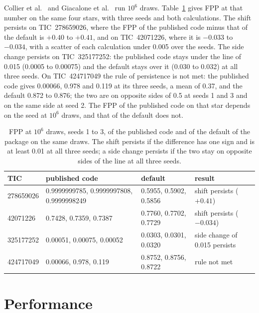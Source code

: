\documentclass[11pt]{article}
\begin{document}
Collier et al.\ \cite{collier2026} and Giacalone et al.\ \cite{giacalone2021} run $10^{6}$ draws. Table~\ref{tab:persistence} gives FPP at that number on the same four stars, with three seeds and both calculations. The shift persists on TIC~278659026, where the FPP of the published code minus that of the default is $+0.40$ to $+0.41$, and on TIC~42071226, where it is $-0.033$ to $-0.034$, with a scatter of each calculation under 0.005 over the seeds. The side change persists on TIC~325177252: the published code stays under the line of 0.015 (0.0005 to 0.00075) and the default stays over it (0.030 to 0.032) at all three seeds. On TIC~424717049 the rule of persistence is not met: the published code gives 0.00066, 0.978 and 0.119 at its three seeds, a mean of 0.37, and the default 0.872 to 0.876; the two are on opposite sides of 0.5 at seeds 1 and 3 and on the same side at seed 2. The FPP of the published code on that star depends on the seed at $10^{6}$ draws, and that of the default does not.

\begin{table}[ht]
\centering
\caption{FPP at $10^{6}$ draws, seeds 1 to 3, of the published code and of the default of the package on the same draws. The shift persists if the difference has one sign and is at least 0.01 at all three seeds; a side change persists if the two stay on opposite sides of the line at all three seeds.}\label{tab:persistence}
\footnotesize
\begin{tabular}{lllp{3.6cm}}
\toprule
TIC & published code & default & result \\
\midrule
278659026 & 0.9999999785, 0.9999997808, 0.9999998249 & 0.5955, 0.5902, 0.5856 & shift persists ($+0.41$) \\
42071226 & 0.7428, 0.7359, 0.7387 & 0.7760, 0.7702, 0.7729 & shift persists ($-0.034$) \\
325177252 & 0.00051, 0.00075, 0.00052 & 0.0303, 0.0301, 0.0320 & side change of 0.015 persists \\
424717049 & 0.00066, 0.978, 0.119 & 0.8752, 0.8756, 0.8722 & rule not met \\
\bottomrule
\end{tabular}
\end{table}


\section{Performance}\label{sec:performance}
\end{document}
